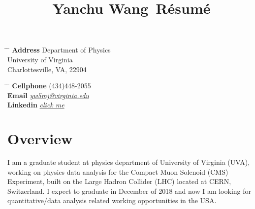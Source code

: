 \documentclass[14pt]{article} %
\begin{document}

\title{Yanchu Wang\, \small{Résumé}} %


\parbox{0.5\textwidth}{ %
\begin{tabbing} %
\hspace{3cm} \= \hspace{4cm} \= \kill %
{\bf Address} \> Department of Physics \\
\> University of Virginia\\ %
\> Charlottesville, VA, 22904 \\ %

\end{tabbing}}
\hfill %
\parbox{0.5\textwidth}{ %
\begin{tabbing} %
\hspace{3cm} \= \hspace{4cm} \= \kill %
{\bf Cellphone} \> (434)448-2055 \\ %
{\bf Email} \> \href{mailto:yw5mj@virginia.edu}{\textit{yw5mj@virginia.edu}} \\ %
{\bf Linkedin} \> \href{https://www.linkedin.com/in/yanchu-wang-46040289/}{\textit{click me}} \\ %
\end{tabbing}}


\section{Overview}

I am a graduate student at physics department of University of Virginia (UVA), working on physics data analysis for the Compact Muon Solenoid (CMS) Experiment, built on the Large Hadron Collider (LHC) located at CERN, Switzerland. I expect to graduate in December of 2018 and now I am looking for quantitative/data analysis related working opportunities in the USA.
\end{document}
